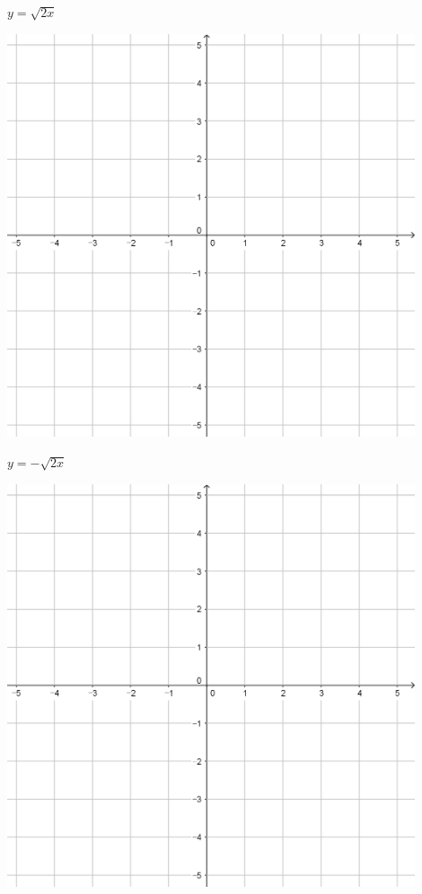 \documentclass[a4paper]{oblivoir}
\begin{document}
\begin{minipage}{0.45\textwidth}\centering
\(y=\sqrt{2x}\)
\par\bigskip\includegraphics[width=0.9\textwidth]{55}
\end{minipage}
\begin{minipage}{0.45\textwidth}\centering
\(y=-\sqrt{2x}\)
\par\bigskip\includegraphics[width=0.9\textwidth]{55}
\end{minipage}\bigskip\bigskip\par
\end{document}
